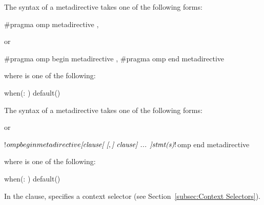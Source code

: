 \syntax
\begin{ccppspecific}
The syntax of a metadirective takes one of the
following forms:
\begin{ompcPragma}
#pragma omp metadirective \plc{[clause[ [},\plc{] clause] ... ] new-line}
\end{ompcPragma}
or
\begin{ompcPragma}
#pragma omp begin metadirective \plc{[clause[ [},\plc{] clause] ... ] new-line}
#pragma omp end metadirective
\end{ompcPragma}


\begin{samepage}
where  is one of the following:
\begin{indentedcodelist}
when(: )
default()
\end{indentedcodelist}
\end{samepage}

\end{ccppspecific}

\begin{fortranspecific}
The syntax of a metadirective takes one of the following forms:


or

\begin{ompfPragma}
!$omp begin metadirective \plc{[clause[ [},\plc{] clause] ... ]}
!$omp end metadirective
\end{ompfPragma}

\begin{samepage}
where  is one of the following:

\begin{indentedcodelist}
when(: )
default()
\end{indentedcodelist}
\end{samepage}

\end{fortranspecific}

In the  clause,  specifies a context
selector (see Section~\ref{subsec:Context Selectors}).



